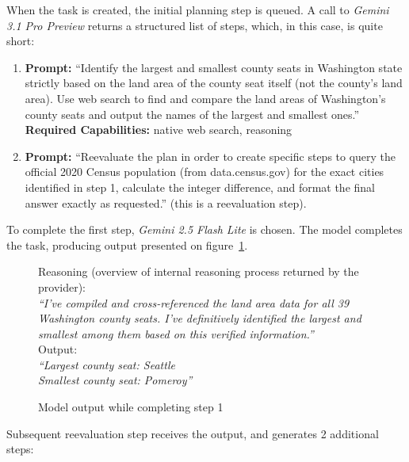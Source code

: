 \documentclass[a4paper,11pt,twoside]{report}
\theoremstyle{definition}
\begin{document}
When the task is created, the initial planning step is queued. A call to \textit{Gemini 3.1 Pro Preview} returns a structured list of steps, which, in this case, is quite short:

\begin{enumerate}
    \item \textbf{Prompt:} ``Identify the largest and smallest county seats in Washington state strictly based on the land area of the county seat itself (not the county's land area). Use web search to find and compare the land areas of Washington's county seats and output the names of the largest and smallest ones.'' \\
    \textbf{Required Capabilities:} native web search, reasoning
    \item \textbf{Prompt:} ``Reevaluate the plan in order to create specific steps to query the official 2020 Census population (from data.census.gov) for the exact cities identified in step 1, calculate the integer difference, and format the final answer exactly as requested.'' (this is a reevaluation step).
\end{enumerate}

To complete the first step, \textit{Gemini 2.5 Flash Lite} is chosen. The model completes the task, producing output presented on figure~\ref{figure:gaia-question-task-execution-example-step-1}.

\begin{figure}[htbp]
    \begin{framed}
        Reasoning (overview of internal reasoning process returned by the provider): \\
        \textit{``I've compiled and cross-referenced the land area data for all 39 Washington county seats. I've definitively identified the largest and smallest among them based on this verified information.''} \\
        Output: \\
        \textit{``Largest county seat: Seattle \\
        Smallest county seat: Pomeroy''}
    \end{framed}
    \caption{Model output while completing step 1}
    \label{figure:gaia-question-task-execution-example-step-1}
\end{figure}

Subsequent reevaluation step receives the output, and generates 2 additional steps:
\end{document}
